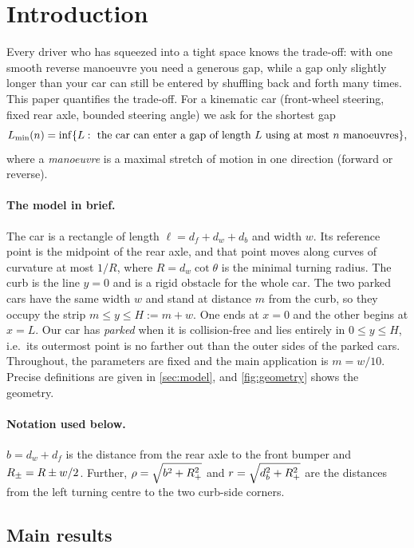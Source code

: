 \section{Introduction}\label{sec:intro}

Every driver who has squeezed into a tight space knows the trade-off: with one smooth reverse manoeuvre you need a generous gap, while a gap only slightly longer than your car can still be entered by shuffling back and forth many times.
This paper quantifies the trade-off.
For a kinematic car (front-wheel steering, fixed rear axle, bounded steering angle) we ask for the shortest gap
\[
  L_{\min}(n)=\inf\{L:\ \text{the car can enter a gap of length $L$ using at most $n$ manoeuvres}\},
\]
where a \emph{manoeuvre} is a maximal stretch of motion in one direction (forward or reverse).

\paragraph{The model in brief.}
The car is a rectangle of length $\ell=d_f+d_w+d_b$ and width $w$.
Its reference point is the midpoint of the rear axle, and that point moves along curves of curvature at most $1/R$, where $R=d_w\cot\theta$ is the minimal turning radius.
The curb is the line $y=0$ and is a rigid obstacle for the whole car.
The two parked cars have the same width $w$ and stand at distance $m$ from the curb, so they occupy the strip $m\le y\le H:=m+w$.
One ends at $x=0$ and the other begins at $x=L$.
Our car has \emph{parked} when it is collision-free and lies entirely in $0\le y\le H$, i.e.\ its outermost point is no farther out than the outer sides of the parked cars.
Throughout, the parameters are fixed and the main application is $m=w/10$.
Precise definitions are given in \cref{sec:model}, and \cref{fig:geometry} shows the geometry.

\paragraph{Notation used below.}
$b=d_w+d_f$ is the distance from the rear axle to the front bumper and $R_{\pm}=R\pm w/2$.
Further, $\rho=\sqrt{b^2+R_{+}^2}$ and $r=\sqrt{d_b^2+R_{+}^2}$ are the distances from the left turning centre to the two curb-side corners.

\subsection{Main results}

